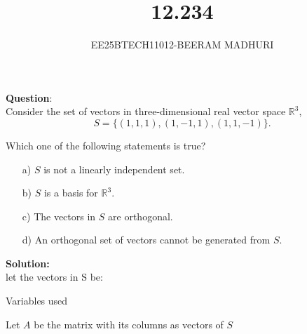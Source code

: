 \documentclass[journal]{IEEEtran}
\begin{document}

\vspace{3cm}

\title{12.234}
\author{EE25BTECH11012-BEERAM MADHURI}
{\let\newpage\relax\maketitle}

\renewcommand{\thefigure}{\theenumi}
\renewcommand{\thetable}{\theenumi}
\setlength{\intextsep}{10pt} %


\renewcommand{\thetable}{\theenumi}


\textbf{Question}:\\
Consider the set of vectors in three-dimensional real vector space $\mathbb{R}^3$,
\[S = \{(1, 1, 1), (1, -1, 1), (1, 1, -1)\}.\]

Which one of the following statements is true?

\begin{enumerate}
\item[a)] $S$ is not a linearly independent set.
\item[b)] $S$ is a basis for $\mathbb{R}^3$.
\item[c)] The vectors in $S$ are orthogonal.
\item[d)] An orthogonal set of vectors cannot be generated from $S$.
\end{enumerate}
\textbf{Solution:}\\
let the vectors in S be:
\begin{table}[H]
    \centering
    
    \caption{Variables used}
    \label{table 12.234}
\end{table}
Let $A$ be the matrix with its columns as vectors of $S$
\end{document}
